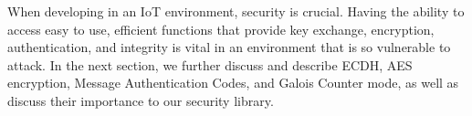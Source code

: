 When developing in an IoT environment, security is crucial. Having the ability to access easy to use, efficient functions that provide key exchange, encryption, authentication, and integrity is vital in an environment that is so vulnerable to attack. In the next section, we further discuss and describe ECDH, AES encryption, Message Authentication Codes, and Galois Counter mode, as well as discuss their importance to our security library.
